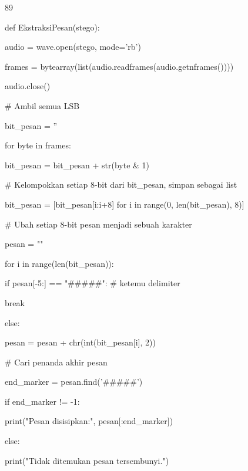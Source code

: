 \documentclass{article}
\begin{document}

89

def EkstraksiPesan(stego):

    audio = wave.open(stego, mode='rb')

    frames = bytearray(list(audio.readframes(audio.getnframes())))

    audio.close()

    \# Ambil semua LSB

    bit\_pesan = ''

    for byte in frames:

        bit\_pesan = bit\_pesan + str(byte \& 1)

   \# Kelompokkan setiap 8-bit dari bit\_pesan, simpan sebagai list          

    bit\_pesan = [bit\_pesan[i:i+8] for i in range(0, len(bit\_pesan), 8)]


    \# Ubah setiap 8-bit pesan menjadi sebuah karakter   

    pesan = ""    

    for i in range(len(bit\_pesan)):       

        if pesan[-5:] == "\#\#\#\#\#":   \# ketemu delimiter     

           break       

        else:            

           pesan = pesan + chr(int(bit\_pesan[i], 2))    

    \# Cari penanda akhir pesan

    end\_marker = pesan.find('\#\#\#\#\#')

    if end\_marker != -1:

        print("Pesan disisipkan:", pesan[:end\_marker])

    else:

        print("Tidak ditemukan pesan tersembunyi.")
\end{document}
